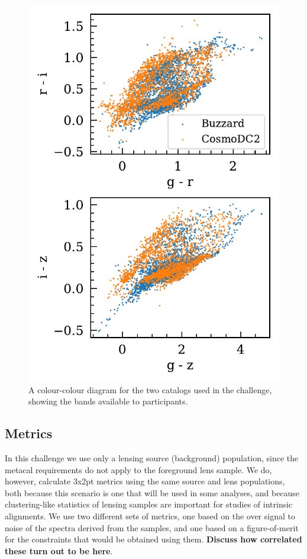 \documentclass[twocolumn,twocolappendix]{aastex63}
\begin{document}
\begin{figure}[htbp]
\includegraphics[width=0.9\linewidth]{results/colour_colour.pdf}
\caption{A colour-colour diagram for the two catalogs used in the challenge, showing the bands
available to participants.}
\label{fig:colour_colour}
\end{figure}






\subsection{Metrics}
\label{sec:metrics}

In this challenge we use only a lensing source (background) population, since the metacal requirements
do not apply to the foreground lens sample. We do, however, calculate 3x2pt metrics using the
same source and lens populations, both because this scenario is one that will be used in some analyses,
and because clustering-like statistics of lensing samples are important for studies of intrinsic
alignments. We use two different sets of metrics, one based on the over signal to noise of the spectra 
derived from the samples, and one based on a figure-of-merit for the constraints that would be obtained 
using them.  \textbf{Discuss how correlated these turn out to be here}.  
\end{document}
